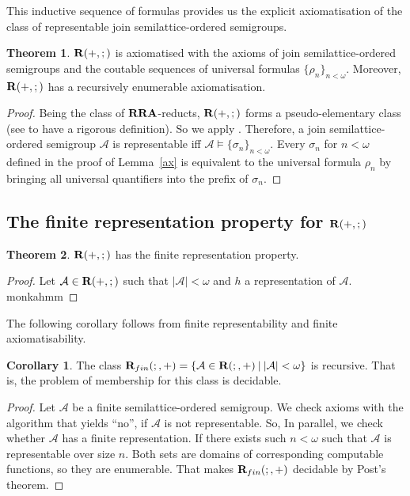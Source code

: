 \documentclass[a4paper]{article}
\theoremstyle{definition}
\theoremstyle{theorem}
\newtheorem{theorem}{Theorem}
\theoremstyle{proposition}
\theoremstyle{lemma}
\theoremstyle{ex}
\theoremstyle{corollary}
\newtheorem{corollary}{Corollary}
\theoremstyle{claim}
\begin{document}
This inductive sequence of formulas provides us the explicit axiomatisation of the class of representable join semilattice-ordered semigroups.

\begin{theorem}
  ${\bf R}(+, ;)$ is axiomatised with the axioms of join semilattice-ordered semigroups and the coutable sequences of universal formulas $\{ \rho_n \}_{n < \omega}$. Moreover, ${\bf R}(+, ;)$ has a recursively enumerable axiomatisation.
\end{theorem}

\begin{proof}
  Being the class of ${\bf RRA}$-reducts, ${\bf R}(+, ;)$ forms a pseudo-elementary class (see \cite{eklof1977ultraproducts} to have a rigorous definition). So we apply \cite[Theorem 9.28]{hirsch2002relation}. Therefore, a join semilattice-ordered semigroup $\mathcal{A}$ is representable iff $\mathcal{A} \models \{ \sigma_n \}_{n < \omega}$. Every $\sigma_n$ for $n < \omega$ defined in the proof of Lemma~\ref{ax} is equivalent to the universal formula $\rho_n$ by bringing all universal quantifiers into the prefix of $\sigma_n$.
\end{proof}

\subsection{The finite representation property for ${\bf R}(+, ;)$}

\begin{theorem}
  ${\bf R}(+, ;)$ has the finite representation property.
\end{theorem}

\begin{proof}
  Let $\mathcal{A} \in {\bf R}(+, ;)$ such that $|\mathcal{A}| < \omega$ and $h$ a representation of $\mathcal{A}$. monkahmm
\end{proof}

The following corollary follows from finite representability and finite axiomatisability.

\begin{corollary}
  The class ${\bf R}_{fin}(;, +) = \{ \mathcal{A} \in {\bf R}(;, +) \: | \: |\mathcal{A}| < \omega \}$ is recursive. That is, the problem of membership for this class is decidable.
\end{corollary}

\begin{proof}
  Let $\mathcal{A}$ be a finite semilattice-ordered semigroup. We check axioms with the algorithm that yields ``no'', if $\mathcal{A}$ is not representable. So,
  In parallel, we check whether $\mathcal{A}$ has a finite representation. If there exists such $n < \omega$ such that $\mathcal{A}$ is representable over size $n$. Both sets are domains of corresponding computable functions, so they are enumerable. That makes ${\bf R}_{fin}(;, +)$ decidable by Post's theorem.
\end{proof}
\end{document}
